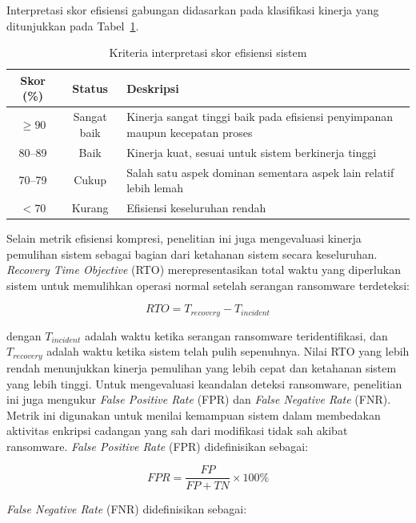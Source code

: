 \documentclass{iaesarticle}
\begin{document}
Interpretasi skor efisiensi gabungan didasarkan pada klasifikasi kinerja yang ditunjukkan pada Tabel~\ref{tab:efficiency_criteria}.

\begin{table}[H]
\centering
\fontsize{8pt}{10pt}\selectfont
\caption{Kriteria interpretasi skor efisiensi sistem}
\label{tab:efficiency_criteria}
\begin{tabularx}{\textwidth}{@{}c c X@{}}
\hline
\textbf{Skor (\%)} & \textbf{Status} & \textbf{Deskripsi} \\
\hline
$\geq 90$ & Sangat baik & Kinerja sangat tinggi baik pada efisiensi penyimpanan maupun kecepatan proses \\
80--89 & Baik & Kinerja kuat, sesuai untuk sistem berkinerja tinggi \\
70--79 & Cukup & Salah satu aspek dominan sementara aspek lain relatif lebih lemah \\
$< 70$ & Kurang & Efisiensi keseluruhan rendah \\
\hline
\end{tabularx}
\end{table}

Selain metrik efisiensi kompresi, penelitian ini juga mengevaluasi kinerja pemulihan sistem sebagai bagian dari ketahanan sistem secara keseluruhan. \textit{Recovery Time Objective} (RTO) merepresentasikan total waktu yang diperlukan sistem untuk memulihkan operasi normal setelah serangan ransomware terdeteksi:

\begin{equation}
RTO = T_{recovery} - T_{incident}
\end{equation}

dengan $T_{incident}$ adalah waktu ketika serangan ransomware teridentifikasi, dan $T_{recovery}$ adalah waktu ketika sistem telah pulih sepenuhnya. Nilai RTO yang lebih rendah menunjukkan kinerja pemulihan yang lebih cepat dan ketahanan sistem yang lebih tinggi. Untuk mengevaluasi keandalan deteksi ransomware, penelitian ini juga mengukur \textit{False Positive Rate} (FPR) dan \textit{False Negative Rate} (FNR). Metrik ini digunakan untuk menilai kemampuan sistem dalam membedakan aktivitas enkripsi cadangan yang sah dari modifikasi tidak sah akibat ransomware. \textit{False Positive Rate} (FPR) didefinisikan sebagai:

\begin{equation}
FPR = \frac{FP}{FP + TN} \times 100\%
\end{equation}

\textit{False Negative Rate} (FNR) didefinisikan sebagai:
\end{document}
